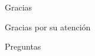 \documentclass[aspectratio=169]{beamer}
\begin{document}

\begin{frame}{Gracias}

\centering

{\Huge Gracias por su atención}

\vspace{1cm}

Preguntas

\end{frame}
\end{document}
